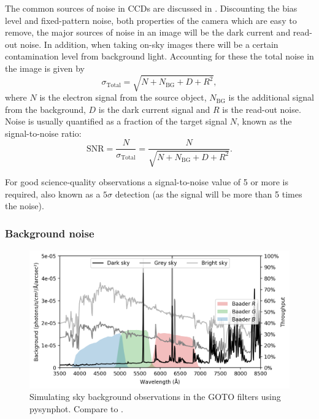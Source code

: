 \begin{colsection}
\begin{colsection}
The common sources of noise in CCDs are discussed in . Discounting the bias level and fixed-pattern noise, both properties of the camera which are easy to remove, the major sources of noise in an image will be the dark current and read-out noise. In addition, when taking on-sky images there will be a certain contamination level from background light. Accounting for these the total noise in the image is given by
%
\begin{equation}
    \sigma_\text{Total} = \sqrt{N + N_\text{BG} + D + R^2},
    \label{eq:total_noise}
\end{equation}
%
where $N$ is the electron signal from the source object, $N_\text{BG}$ is the additional signal from the background, $D$ is the dark current signal and $R$ is the read-out noise. Noise is usually quantified as a fraction of the target signal $N$, known as the signal-to-noise ratio:
%
\begin{equation}
    \text{SNR} = \frac{N}{\sigma_\text{Total}} = \frac{N}{\sqrt{N + N_\text{BG} + D + R^2}}.
    \label{eq:snr}
\end{equation}

For good science-quality observations a signal-to-noise value of 5 or more is required, also known as a $5\sigma$ detection (as the signal will be more than 5 times the noise).

\newpage

\subsubsection{Background noise}

\begin{figure}[t]
    \begin{center}
        \includegraphics[width=\textwidth]{images/throughput/background.png}
    \end{center}
    \caption[Simulating sky background observations]{
        Simulating sky background observations in the GOTO filters using pysynphot. Compare to .
    }\label{fig:background}
\end{figure}


\end{colsection}
\end{colsection}
